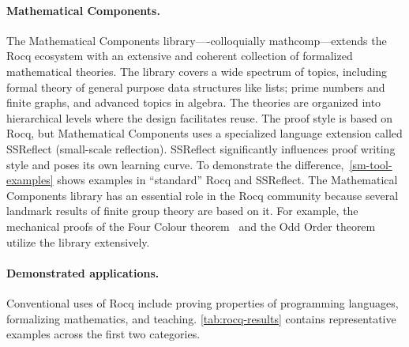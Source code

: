 \paragraph*{Mathematical Components.}
The Mathematical Components library---\hyp{}colloquially mathcomp---extends the Rocq ecosystem with an extensive and coherent collection of formalized mathematical theories.
The library covers a wide spectrum of topics, including formal theory of general purpose data structures like lists;
prime numbers and finite graphs, and advanced topics in algebra.
The theories are organized into hierarchical levels where the design facilitates reuse.
The proof style is based on Rocq, but Mathematical Components uses a specialized language extension called SSReflect (small-scale reflection).
SSReflect significantly influences proof writing style and poses its own learning curve.
To demonstrate the difference,~\autoref{sm-tool-examples} shows examples in \enquote{standard} Rocq and SSReflect.
The Mathematical Components library has an essential role in the Rocq community because several landmark results of finite group theory are based on it.
For example, the mechanical proofs of the Four Colour theorem~\cite{gonthier2008} and the Odd Order theorem~\cite{gonthier2013} utilize the library extensively.

\paragraph*{Demonstrated applications.}
Conventional uses of Rocq include proving properties of programming languages, formalizing mathematics, and teaching.
\autoref{tab:rocq-results} contains representative examples across the first two categories.

